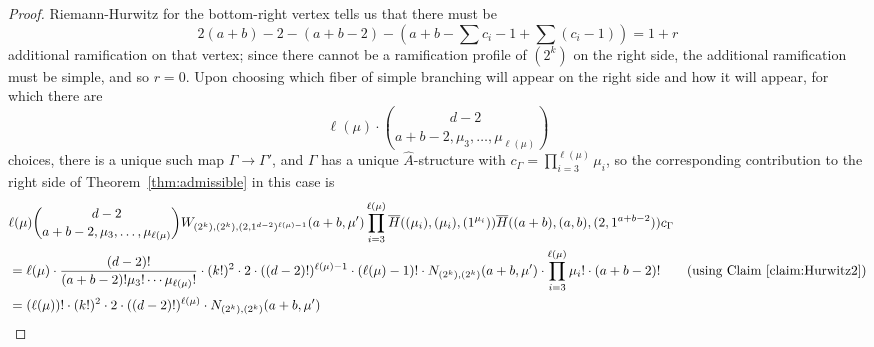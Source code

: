 \documentclass[11pt]{article}           %
\theoremstyle{definition}
\begin{document}
\begin{proof}

  Riemann-Hurwitz for the bottom-right vertex tells us that there must be
  \[
  2(a+b)-2-(a+b-2)-\left(a+b-\sum c_i-1+\sum(c_i-1)\right)=1+r
  \]
  additional ramification on that vertex; since there cannot be a ramification profile of $(2^k)$
  on the right side, the additional ramification must be simple, and so $r=0$.
  Upon
  choosing which fiber of simple branching will appear on the right side and how it will appear,
  for which there are
  \[
  \ell(\mu)\cdot \binom{d-2}{a+b-2,\mu_3,\dots,\mu_{\ell(\mu)}}
  \]
  choices, there is a unique such map $\Gamma\to\Gamma'$, and $\Gamma$ has a unique $\hat A$-structure
  with $c_{\Gamma}=\prod\limits_{i=3}^{\ell(\mu)}\mu_i$, so the corresponding contribution to the right side of Theorem~\ref{thm:admissible} in this case is
  \begin{align*}
    &\ell(\mu)\binom{d-2}{a+b-2,\mu_3,\dots,\mu_{\ell(\mu)}} W_{(2^k),(2^k),(2,1^{d-2})^{\ell(\mu)-1}}(a+b,\mu') \prod_{i=3}^{\ell(\mu)}\overline H((\mu_i),(\mu_i),(1^{\mu_i})) \overline H((a+b),(a,b),(2,1^{a+b-2})) c_{\Gamma} \\
    &=\ell(\mu)\cdot\frac{(d-2)!}{(a+b-2)!\mu_3!\cdots\mu_{\ell(\mu)}!}\cdot (k!)^2\cdot 2\cdot((d-2)!)^{\ell(\mu)-1}\cdot (\ell(\mu)-1)!\cdot N_{(2^k),(2^k)}(a+b,\mu')\cdot\prod_{i=3}^{\ell(\mu)}\mu_i!\cdot (a+b-2)! \tag*{(using Claim~\ref{claim:Hurwitz2})} \\
    &=(\ell(\mu))!\cdot (k!)^2\cdot 2\cdot((d-2)!)^{\ell(\mu)}\cdot N_{(2^k),(2^k)}(a+b,\mu') \\
  \end{align*}


\end{proof}
\end{document}
